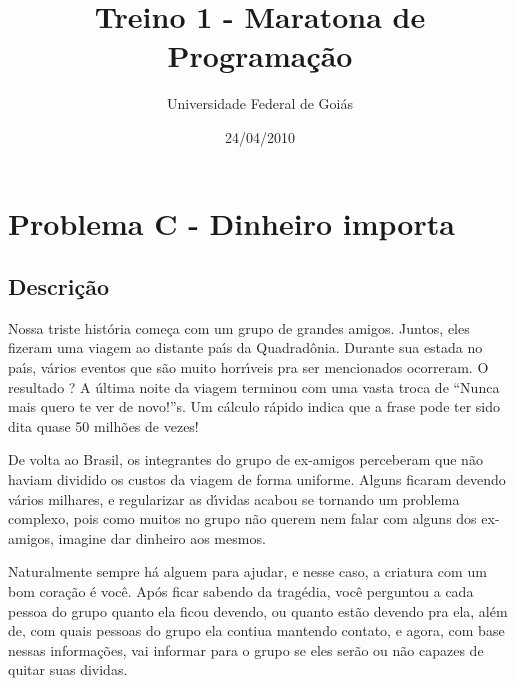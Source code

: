 \documentclass[14pt]{article}
\title{Treino 1 - Maratona de Programa\c{c}\~ao }
\author{Universidade Federal de Goi\'as}
\date{24/04/2010}                                           %
\begin{document}
\maketitle




\section{Problema C - Dinheiro importa}

\subsection{Descri\c{c}\~ao}


Nossa triste hist\'oria come\c{c}a com um grupo de grandes amigos. Juntos, eles fizeram uma viagem ao distante pa\'{\i}s da Quadrad\^onia. Durante sua estada no pa\'{\i}s, v\'arios eventos que s\~ao muito horr\'{\i}veis pra ser mencionados ocorreram. O resultado ? A \'ultima noite da viagem terminou com uma vasta troca de ``Nunca mais quero te ver de novo!''s. Um c\'alculo r\'apido indica que a frase pode ter sido dita quase 50 milh\~oes de vezes!

De volta ao Brasil, os integrantes do grupo de ex-amigos perceberam que n\~ao haviam dividido os custos da viagem de forma uniforme. Alguns ficaram devendo  v\'arios milhares, e regularizar as d\'{\i}vidas acabou se tornando um problema complexo, pois como muitos no grupo n\~ao querem nem falar com alguns dos ex-amigos, imagine dar dinheiro aos mesmos.

Naturalmente sempre h\'a alguem para ajudar, e nesse caso, a criatura com um bom cora\c{c}\~ao \'e voc\^e. Ap\'os ficar sabendo da trag\'edia, 
voc\^e perguntou a cada pessoa do grupo quanto ela ficou devendo, ou quanto est\~ao devendo pra ela, al\'em de, com quais pessoas do grupo ela contiua mantendo contato, e agora, com base nessas informa\c{c}\~oes, vai informar para o grupo se eles ser\~ao ou n\~ao capazes de quitar suas dividas.
\end{document}
